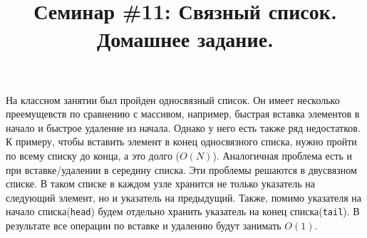 \documentclass{article}
\begin{document}



\title{Семинар \#11: Связный список. Домашнее задание.\vspace{-5ex}}\date{}\maketitle
На классном занятии был пройден односвязный список. Он имеет несколько преемущевств по сравнению с массивом, например, быстрая вставка элементов в начало и быстрое удаление из начала. Однако у него есть также ряд недостатков. К примеру, чтобы вставить элемент в конец односвязного списка, нужно пройти по всему списку до конца, а это долго ($O(N)$). Аналогичная проблема есть и при вставке/удалении в середину списка. Эти проблемы решаются в двусвязном списке. В таком списке в каждом узле хранится не только указатель на следующий элемент, но и указатель на предыдущий. Также, помимо указателя на начало списка(\texttt{head}) будем отдельно хранить указатель на конец списка(\texttt{tail}). В результате все операции по вставке и удалению будут занимать $O(1)$.\\
\end{document}
